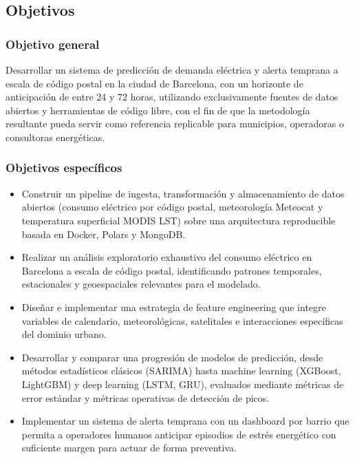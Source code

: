 \documentclass[12pt, a4paper]{article}
\begin{document}
\subsection{Objetivos}


\subsubsection{Objetivo general}


Desarrollar un sistema de predicción de demanda eléctrica y alerta temprana a escala de código postal en la ciudad de Barcelona, con un horizonte de anticipación de entre 24 y 72 horas, utilizando exclusivamente fuentes de datos abiertos y herramientas de código libre, con el fin de que la metodología resultante pueda servir como referencia replicable para municipios, operadoras o consultoras energéticas.

\subsubsection{Objetivos específicos}


\begin{itemize}
  \item Construir un pipeline de ingesta, transformación y almacenamiento de datos abiertos (consumo eléctrico por código postal, meteorología Meteocat y temperatura superficial MODIS LST) sobre una arquitectura reproducible basada en Docker, Polars y MongoDB.
  \item Realizar un análisis exploratorio exhaustivo del consumo eléctrico en Barcelona a escala de código postal, identificando patrones temporales, estacionales y geoespaciales relevantes para el modelado.
  \item Diseñar e implementar una estrategia de feature engineering que integre variables de calendario, meteorológicas, satelitales e interacciones específicas del dominio urbano.
  \item Desarrollar y comparar una progresión de modelos de predicción, desde métodos estadísticos clásicos (SARIMA) hasta machine learning (XGBoost, LightGBM) y deep learning (LSTM, GRU), evaluados mediante métricas de error estándar y métricas operativas de detección de picos.
  \item Implementar un sistema de alerta temprana con un dashboard por barrio que permita a operadores humanos anticipar episodios de estrés energético con suficiente margen para actuar de forma preventiva.
\end{itemize}
\end{document}
